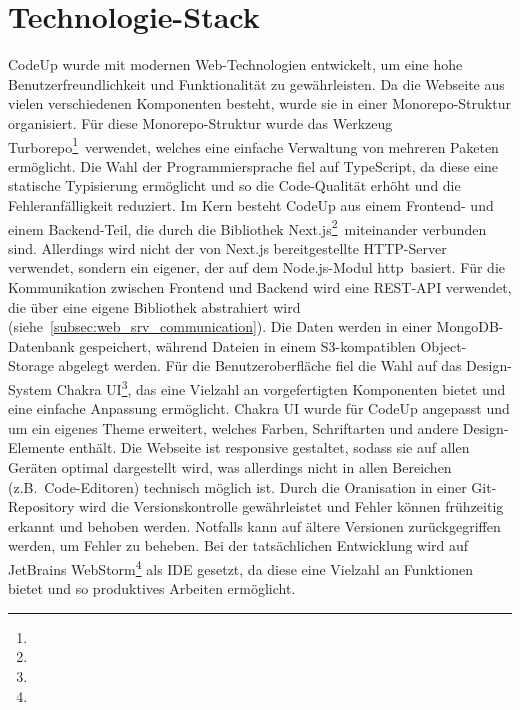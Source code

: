 \documentclass[main.tex]{subfiles}
\begin{document}
    \section{Technologie-Stack}
    CodeUp wurde mit modernen Web-Technologien entwickelt, um eine hohe Benutzerfreundlichkeit und Funktionalität zu gewährleisten.
    Da die Webseite aus vielen verschiedenen Komponenten besteht, wurde sie in einer Monorepo-Struktur organisiert.
    Für diese Monorepo-Struktur wurde das Werkzeug \dq Turborepo\dq\footnote{}\ verwendet, welches eine einfache Verwaltung von mehreren Paketen ermöglicht.
    Die Wahl der Programmiersprache fiel auf TypeScript, da diese eine statische Typisierung ermöglicht und so die Code-Qualität erhöht und die Fehleranfälligkeit reduziert.
    Im Kern besteht CodeUp aus einem Frontend- und einem Backend-Teil, die durch die Bibliothek \dq Next.js\dq\footnote{}\ miteinander verbunden sind.
    Allerdings wird nicht der von Next.js bereitgestellte HTTP-Server verwendet, sondern ein eigener, der auf dem Node.js-Modul \dq http\dq\ basiert.
    Für die Kommunikation zwischen Frontend und Backend wird eine REST-API verwendet, die über eine eigene Bibliothek abstrahiert wird (siehe~\ref{subsec:web_srv_communication}).
    Die Daten werden in einer MongoDB-Datenbank gespeichert, während Dateien in einem S3-kompatiblen Object-Storage abgelegt werden.
    Für die Benutzeroberfläche fiel die Wahl auf das Design-System \dq Chakra UI\dq\footnote{}, das eine Vielzahl an vorgefertigten Komponenten bietet und eine einfache Anpassung ermöglicht.
    Chakra UI wurde für CodeUp angepasst und um ein eigenes Theme erweitert, welches Farben, Schriftarten und andere Design-Elemente enthält.
    Die Webseite ist responsive gestaltet, sodass sie auf allen Geräten optimal dargestellt wird, was allerdings nicht in allen Bereichen (z.B.~Code-Editoren) technisch möglich ist.
    Durch die Oranisation in einer Git-Repository wird die Versionskontrolle gewährleistet und Fehler können frühzeitig erkannt und behoben werden.
    Notfalls kann auf ältere Versionen zurückgegriffen werden, um Fehler zu beheben.
    Bei der tatsächlichen Entwicklung wird auf JetBrains WebStorm\footnote{} als IDE gesetzt, da diese eine Vielzahl an Funktionen bietet und so produktives Arbeiten ermöglicht.
    
\end{document}
